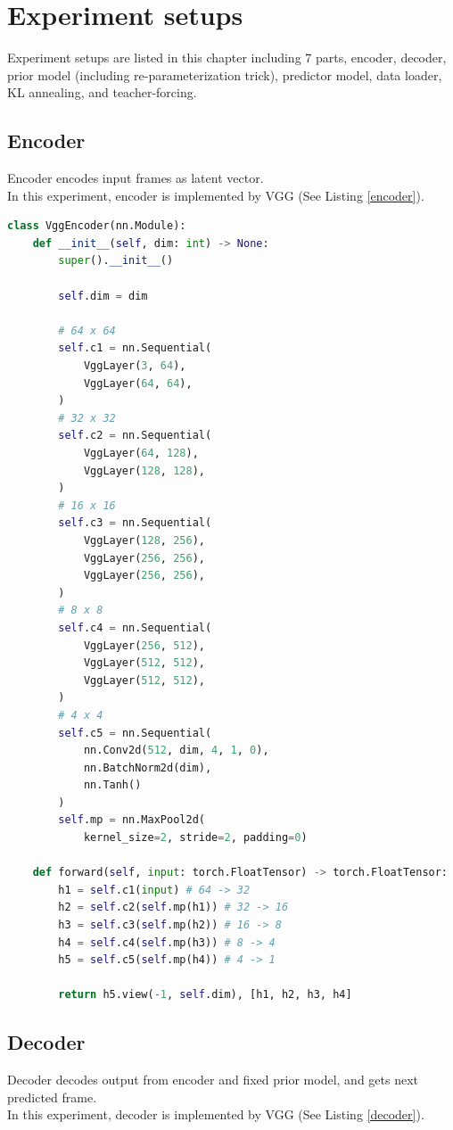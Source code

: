 \chapter{Experiment setups}
\indent
    Experiment setups are listed in this chapter including 7 parts, 
    encoder, decoder, prior model (including re-parameterization trick), predictor model, data loader, KL annealing, and teacher-forcing.

\section{Encoder}
\indent
	Encoder encodes input frames as latent vector. \\
    In this experiment, encoder is implemented by VGG (See Listing \ref{encoder}).

\begin{lstlisting}[language=Python, caption={Python code of \textcolor{blue}{\textbf{VggEncoder}}.}, label={encoder}]
class VggEncoder(nn.Module):
    def __init__(self, dim: int) -> None:
        super().__init__()
        
        self.dim = dim
        
        # 64 x 64
        self.c1 = nn.Sequential(
            VggLayer(3, 64),
            VggLayer(64, 64),
        )
        # 32 x 32
        self.c2 = nn.Sequential(
            VggLayer(64, 128),
            VggLayer(128, 128),
        )
        # 16 x 16 
        self.c3 = nn.Sequential(
            VggLayer(128, 256),
            VggLayer(256, 256),
            VggLayer(256, 256),
        )
        # 8 x 8
        self.c4 = nn.Sequential(
            VggLayer(256, 512),
            VggLayer(512, 512),
            VggLayer(512, 512),
        )
        # 4 x 4
        self.c5 = nn.Sequential(
            nn.Conv2d(512, dim, 4, 1, 0),
            nn.BatchNorm2d(dim),
            nn.Tanh()
        )
        self.mp = nn.MaxPool2d(
            kernel_size=2, stride=2, padding=0)

    def forward(self, input: torch.FloatTensor) -> torch.FloatTensor:
        h1 = self.c1(input) # 64 -> 32
        h2 = self.c2(self.mp(h1)) # 32 -> 16
        h3 = self.c3(self.mp(h2)) # 16 -> 8
        h4 = self.c4(self.mp(h3)) # 8 -> 4
        h5 = self.c5(self.mp(h4)) # 4 -> 1
        
        return h5.view(-1, self.dim), [h1, h2, h3, h4]\end{lstlisting}

\section{Decoder}
\indent
    Decoder decodes output from encoder and fixed prior model, 
    and gets next predicted frame. \\
    In this experiment, decoder is implemented by VGG (See Listing \ref{decoder}).

